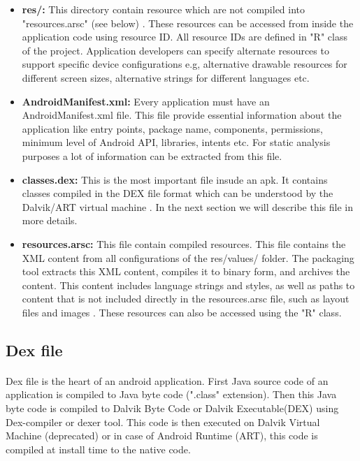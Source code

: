 \documentclass[../main.tex]{subfile}
\begin{document}
\begin{itemize}
			\item \textbf{res/:} This directory contain resource which are not compiled into "resources.arsc" (see below) \cite{APK_structure}. These resources can be accessed from inside the application code using resource ID. All resource IDs are defined in "R" class of the project. Application developers can specify alternate resources to support specific device configurations e.g, alternative drawable resources for different screen sizes, alternative strings for different languages etc.
			
			\item \textbf{AndroidManifest.xml:} Every application must have an AndroidManifest.xml file. This file provide essential information about the application like entry points, package name, components, permissions, minimum level of Android API, libraries, intents etc. For static analysis purposes a lot of information can be extracted from this file.
			
			\item \textbf{classes.dex:} This is the most important file insude an apk. It contains classes compiled in the DEX file format which can be understood by the Dalvik/ART virtual machine \cite{APK_structure}. In the next section we will describe this file in more details.
			
			\item \textbf{resources.arsc:} This file contain compiled resources. This file contains the XML content from all configurations of the res/values/ folder. The packaging tool extracts this XML content, compiles it to binary form, and archives the content. This content includes language strings and styles, as well as paths to content that is not included directly in the resources.arsc file, such as layout files and images \cite{APK_structure}. These resources can also be accessed using the "R" class.
		\end{itemize}
		
	\subsection{Dex file}\label{sec:dex}
		\paragraph{} Dex file is the heart of an android application. First Java source code of an application is compiled to Java byte code (".class" extension). Then this Java byte code is compiled to Dalvik Byte Code or Dalvik Executable(DEX) using Dex-compiler or dexer tool. This code is then executed on Dalvik Virtual Machine (deprecated) or in case of Android Runtime (ART), this code is compiled at install time to the native code. 
\end{document}
